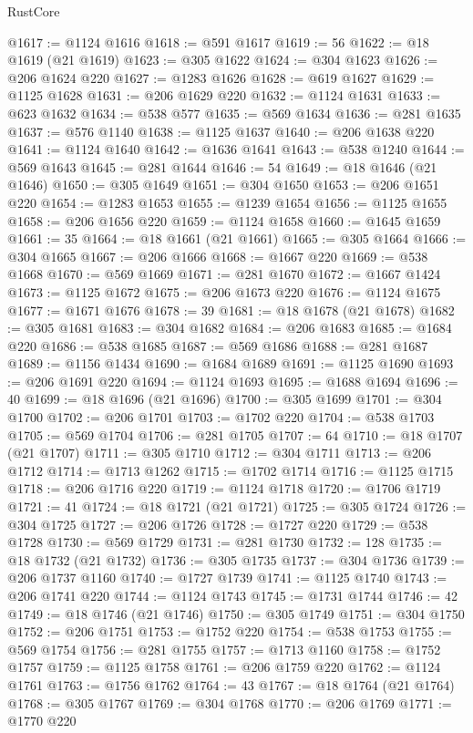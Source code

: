 \begin{lexlean}{RustCore}
\begin{coremodule}
@1617 := @1124 @1616
@1618 := @591 @1617
@1619 := 56
@1622 := @18 @1619 (@21 @1619)
@1623 := @305 @1622
@1624 := @304 @1623
@1626 := @206 @1624 @220
@1627 := @1283 @1626
@1628 := @619 @1627
@1629 := @1125 @1628
@1631 := @206 @1629 @220
@1632 := @1124 @1631
@1633 := @623 @1632
@1634 := @538 @577
@1635 := @569 @1634
@1636 := @281 @1635
@1637 := @576 @1140
@1638 := @1125 @1637
@1640 := @206 @1638 @220
@1641 := @1124 @1640
@1642 := @1636 @1641
@1643 := @538 @1240
@1644 := @569 @1643
@1645 := @281 @1644
@1646 := 54
@1649 := @18 @1646 (@21 @1646)
@1650 := @305 @1649
@1651 := @304 @1650
@1653 := @206 @1651 @220
@1654 := @1283 @1653
@1655 := @1239 @1654
@1656 := @1125 @1655
@1658 := @206 @1656 @220
@1659 := @1124 @1658
@1660 := @1645 @1659
@1661 := 35
@1664 := @18 @1661 (@21 @1661)
@1665 := @305 @1664
@1666 := @304 @1665
@1667 := @206 @1666
@1668 := @1667 @220
@1669 := @538 @1668
@1670 := @569 @1669
@1671 := @281 @1670
@1672 := @1667 @1424
@1673 := @1125 @1672
@1675 := @206 @1673 @220
@1676 := @1124 @1675
@1677 := @1671 @1676
@1678 := 39
@1681 := @18 @1678 (@21 @1678)
@1682 := @305 @1681
@1683 := @304 @1682
@1684 := @206 @1683
@1685 := @1684 @220
@1686 := @538 @1685
@1687 := @569 @1686
@1688 := @281 @1687
@1689 := @1156 @1434
@1690 := @1684 @1689
@1691 := @1125 @1690
@1693 := @206 @1691 @220
@1694 := @1124 @1693
@1695 := @1688 @1694
@1696 := 40
@1699 := @18 @1696 (@21 @1696)
@1700 := @305 @1699
@1701 := @304 @1700
@1702 := @206 @1701
@1703 := @1702 @220
@1704 := @538 @1703
@1705 := @569 @1704
@1706 := @281 @1705
@1707 := 64
@1710 := @18 @1707 (@21 @1707)
@1711 := @305 @1710
@1712 := @304 @1711
@1713 := @206 @1712
@1714 := @1713 @1262
@1715 := @1702 @1714
@1716 := @1125 @1715
@1718 := @206 @1716 @220
@1719 := @1124 @1718
@1720 := @1706 @1719
@1721 := 41
@1724 := @18 @1721 (@21 @1721)
@1725 := @305 @1724
@1726 := @304 @1725
@1727 := @206 @1726
@1728 := @1727 @220
@1729 := @538 @1728
@1730 := @569 @1729
@1731 := @281 @1730
@1732 := 128
@1735 := @18 @1732 (@21 @1732)
@1736 := @305 @1735
@1737 := @304 @1736
@1739 := @206 @1737 @1160
@1740 := @1727 @1739
@1741 := @1125 @1740
@1743 := @206 @1741 @220
@1744 := @1124 @1743
@1745 := @1731 @1744
@1746 := 42
@1749 := @18 @1746 (@21 @1746)
@1750 := @305 @1749
@1751 := @304 @1750
@1752 := @206 @1751
@1753 := @1752 @220
@1754 := @538 @1753
@1755 := @569 @1754
@1756 := @281 @1755
@1757 := @1713 @1160
@1758 := @1752 @1757
@1759 := @1125 @1758
@1761 := @206 @1759 @220
@1762 := @1124 @1761
@1763 := @1756 @1762
@1764 := 43
@1767 := @18 @1764 (@21 @1764)
@1768 := @305 @1767
@1769 := @304 @1768
@1770 := @206 @1769
@1771 := @1770 @220

\end{coremodule}
\end{lexlean}
